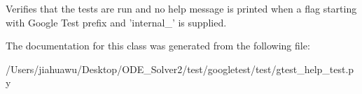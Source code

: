 \begin{DoxyVerb}Verifies that the tests are run and no help message is printed when
a flag starting with Google Test prefix and 'internal_' is supplied.\end{DoxyVerb}
 

The documentation for this class was generated from the following file\+:\begin{DoxyCompactItemize}
\item 
/\+Users/jiahuawu/\+Desktop/\+O\+D\+E\+\_\+\+Solver2/test/googletest/test/gtest\+\_\+help\+\_\+test.\+py\end{DoxyCompactItemize}

